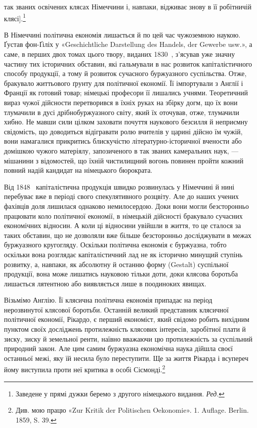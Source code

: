 \parcont{}  %
так званих освічених клясах Німеччини і, навпаки, відживає
знову в її робітничій клясі].\footnote*{
Заведене у прямі дужки беремо з другого німецького видання. \emph{Ред.}
}

В Німеччині політична економія лишається й по цей час чужоземною
наукою. Ґустав фон-Ґіліх у «Geschichtliche Darstellung
des Handels, der Gewerbe usw.», а саме, в перших двох томах
цього твору, виданих 1830~, з’ясував уже значну частину тих
історичних обставин, які гальмували в нас розвиток капіталістичного
способу продукції, а тому й розвиток сучасного буржуазного
суспільства. Отже, бракувало життьового ґрунту для політичної
економії. Її імпортували з Англії і Франції як готовий товар;
німецькі професори її лишались учнями. Теоретичний вираз чужої
дійсности перетворився в їхніх руках на збірку догм, що їх
вони тлумачили в дусі дрібнобуржуазного світу, який їх оточував,
отже, тлумачили хибно. Не мавши сили цілком заховати почуття
наукового безсилля й неприємну свідомість, що доводиться
відігравати ролю вчителів у царині дійсно їм чужій, вони намагалися
прикритись блискучістю літературно-історичної вчености
або домішкою чужого матеріялу, запозиченого в так званих камеральних
наук, — мішанини з відомостей, що їхній чистилищний
вогонь повинен пройти кожний повний надій кандидат на
німецького бюрократа.

Від 1848~ капіталістична продукція швидко розвинулась у
Німеччині й нині перебуває вже в періоді свого спекулятивного
розцвіту. Але до наших учених фахівців доля лишилася однаково
немилосердою. Доки вони могли безсторонньо працювати коло
політичної економії, в німецькій дійсності бракувало сучасних економічних
відносин. А коли ці відносини увійшли в життя, то це сталося
за таких обставин, що не дозволяли вже більше безсторонньо
досліджувати в межах буржуазного кругогляду. Оскільки політична
економія є буржуазна, тобто оскільки вона розглядає капіталістичний
лад не як історично минущий ступінь розвитку,
а, навпаки, як абсолютну й останню форму (Gestalt) суспільної
продукції, вона може лишатись науковою тільки доти, доки клясова
боротьба лишається лятентною або виявляється лише в
поодиноких явищах.

Візьмімо Англію. Її клясична політична економія припадає на
період нерозвинутої клясової боротьби. Останній великий представник
клясичної політичної економії, Рікардо, є перший економіст,
який свідомо робить вихідним пунктом своїх досліджень
протилежність клясових інтересів, заробітної плати й зиску, зиску
й земельної ренти, наївно вважаючи цю протилежність за суспільний
природний закон. Але цим самим буржуазна економічна
наука дійшла своєї останньої межі, яку їй несила було переступити.
Ще за життя Рікарда і всупереч йому виступила проти
неї критика в особі Сісмонді.\footnote{
Див. мою працю «Zur Kritik der Politischen Oekonomie». 1. Auflage.
Berlin. 1859, S. 39.
}
